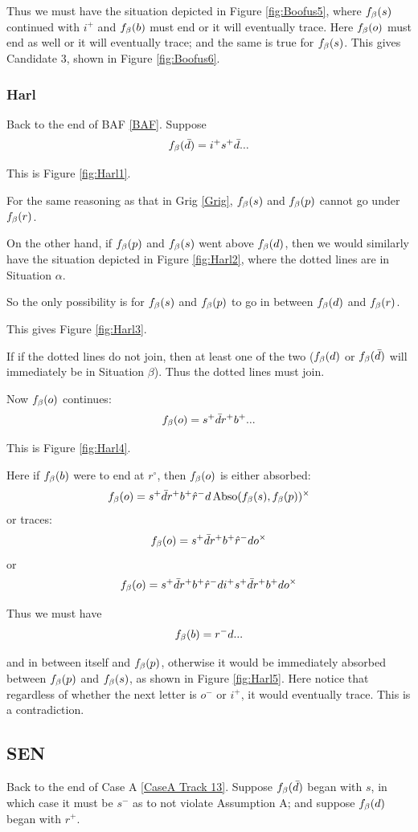 Thus we must have the situation depicted in Figure \ref{fig:Boofus5}, where $f_\beta(s)$ continued with $i^+$ and $f_\beta(b)$ must end or it will eventually trace. Here $f_\beta(o)$ must end as well or it will eventually trace; and the same is true for $f_\beta(s)$. This gives Candidate 3, shown in Figure \ref{fig:Boofus6}.

\subsubsection{Harl}\label{Harl}
Back to the end of BAF \ref{BAF}. Suppose 
\[
f_\beta(\bar{d}) = i^+ s^+ \bar{d}...
\]

This is Figure \ref{fig:Harl1}.

For the same reasoning as that in Grig \ref{Grig}, $f_\beta(s)$ and $f_\beta(p)$ cannot go under $f_\beta(r)$. 

On the other hand, if $f_\beta(p)$ and $f_\beta(s)$ went above $f_\beta(d)$, then we would similarly have the situation depicted in Figure \ref{fig:Harl2}, where  the dotted lines are in Situation $\alpha$.

So the only possibility is for $f_\beta(s)$ and $f_\beta(p)$ to go in between $f_\beta(d)$ and $f_\beta(r)$.

This gives Figure \ref{fig:Harl3}.

If if the dotted lines do not join, then at least one of the two ($f_\beta(d)$ or $f_\beta(\bar{d})$ will immediately be in Situation $\beta$). Thus the dotted lines must join.

Now $f_\beta(o)$ continues:
\[
f_\beta(o) = s^+ \bar{d} r^+ b^+...
\]

This is Figure \ref{fig:Harl4}. 

Here if $f_\beta(b)$ were to end at $r^\circ$, then $f_\beta(o)$ is either absorbed:
\[
f_\beta(o) = s^+ \bar{d} r^+ b^+ \hat{r}^- d \operatorname{Abso}(f_\beta(s), f_\beta(p))^\times
\]
or traces:
\[
f_\beta(o) = s^+ \bar{d} r^+ b^+ \hat{r}^- d o^\times
\]
or
\[
f_\beta(o) = s^+ \bar{d} r^+ b^+ \hat{r}^- d i^+ s^+ \bar{d} r^+ b^+ d o^\times
\]

Thus we must have
\[
f_\beta(b) = r^- d...
\]

and in between itself and $f_\beta(p)$, otherwise it would be immediately absorbed between $f_\beta(p)$ and $f_\beta(s)$, as shown in Figure \ref{fig:Harl5}. Here notice that regardless of whether the next letter is $o^-$ or $i^+$, it would eventually trace. This is a contradiction.

\subsection{SEN}\label{SEN}
Back to the end of Case A \ref{CaseA Track 13}. Suppose $f_\beta(\bar{d})$ began with $s$, in which case it must be $s^-$ as to not violate Assumption A; and suppose $f_\beta(d)$ began with $r^+$.

